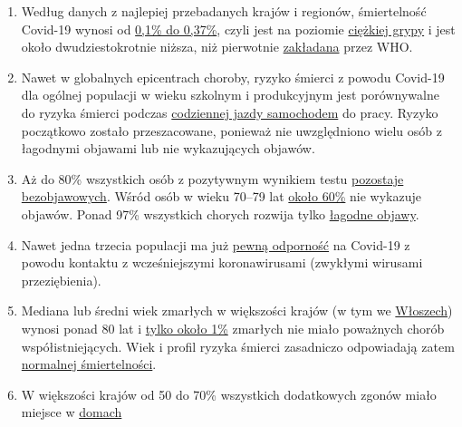 \begin{enumerate}
\def\labelenumi{\arabic{enumi}.}
\tightlist
\item
  Według danych z najlepiej przebadanych krajów i regionów, śmiertelność
  Covid-19 wynosi od
  \href{https://swprs.org/studies-on-covid-19-lethality/}{0,1\% do
  0,37\%}, czyli jest na poziomie
  \href{https://www.ebm-netzwerk.de/en/publications/covid-19}{ciężkiej
  grypy} i jest około dwudziestokrotnie niższa, niż pierwotnie
  \href{https://www.businessinsider.com/coronavirus-death-rate-by-age-countries-2020-3}{zakładana}
  przez WHO.
\item
  Nawet w globalnych epicentrach choroby, ryzyko śmierci z powodu
  Covid-19 dla ogólnej populacji w wieku szkolnym i produkcyjnym jest
  porównywalne do ryzyka śmierci podczas
  \href{https://www.medrxiv.org/content/10.1101/2020.04.05.20054361v1}{codziennej
  jazdy samochodem} do pracy. Ryzyko początkowo zostało przeszacowane,
  ponieważ nie uwzględniono wielu osób z łagodnymi objawami lub nie
  wykazujących objawów.
\item
  Aż do 80\% wszystkich osób z pozytywnym wynikiem testu
  \href{https://www.bmj.com/content/369/bmj.m1375}{pozostaje
  bezobjawowych}. Wśród osób w wieku 70--79 lat
  \href{https://www.niid.go.jp/niid/en/2019-ncov-e/9407-covid-dp-fe-01.html}{około
  60\%} nie wykazuje objawów. Ponad 97\% wszystkich chorych rozwija
  tylko
  \href{https://swprs.org/studies-on-covid-19-lethality/\#hospitalizations}{łagodne
  objawy}.
\item
  Nawet jedna trzecia populacji ma już
  \href{https://www.medrxiv.org/content/10.1101/2020.04.17.20061440v1}{pewną
  odporność} na Covid-19 z powodu kontaktu z wcześniejszymi
  koronawirusami (zwykłymi wirusami przeziębienia).
\item
  Mediana lub średni wiek zmarłych w większości krajów (w tym we
  \href{https://www.epicentro.iss.it/coronavirus/sars-cov-2-decessi-italia}{Włoszech})
  wynosi ponad 80 lat i
  \href{https://www.bloomberg.com/news/articles/2020-03-18/99-of-those-who-died-from-virus-had-other-illness-italy-says}{tylko
  około 1\%} zmarłych nie miało poważnych chorób współistniejących. Wiek
  i profil ryzyka śmierci zasadniczo odpowiadają zatem
  \href{https://www.vienna.at/analyse-zeigt-covid-19-opferkurve-entspricht-normaler-mortalitaet/6581246}{normalnej
  śmiertelności}.
\item
  W większości krajów od 50 do 70\% wszystkich dodatkowych zgonów miało
  miejsce w
  \href{https://ltccovid.org/2020/04/12/mortality-associated-with-covid-19-outbreaks-in-care-homes-early-international-evidence/}{domach
}
\end{enumerate}
